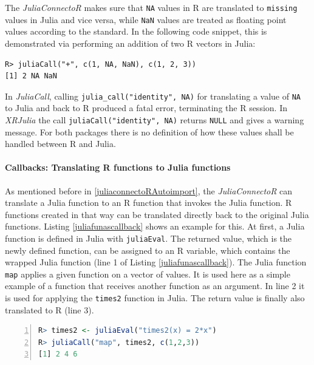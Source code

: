 \documentclass[12pt]{article}
\newcommand{\inlinecode}[1]{\texttt{#1}}
\newcommand{\apkg}[1]{\emph{#1}}
\begin{document}
The \apkg{JuliaConnectoR} makes sure that \inlinecode{NA} values in R are translated to \inlinecode{missing} values in Julia and vice versa, while \inlinecode{NaN} values are treated as floating point values according to the standard.
In the following code snippet, this is demonstrated via performing an addition of two R vectors in Julia:

\begin{lstlisting}
R> juliaCall("+", c(1, NA, NaN), c(1, 2, 3))
[1] 2 NA NaN
\end{lstlisting}


In \apkg{JuliaCall}, calling \inlinecode{julia\_call("identity", NA)} for translating a value of \inlinecode{NA} to Julia and back to R produced a fatal error, terminating the R session.
In \apkg{XRJulia} the call \inlinecode{juliaCall("identity", NA)} returns \inlinecode{NULL} and gives a warning message.
For both packages there is no definition of how these values shall be handled between R and Julia.


\paragraph{Callbacks: Translating R functions to Julia functions}\label{juliaconnectorcallbacks}

As mentioned before in \ref{juliaconnectoRAutoimport}, the \apkg{JuliaConnectoR} can translate a Julia function to an R function that invokes the Julia function.
R functions created in that way can be translated directly back to the original Julia functions.
Listing \ref{juliafunascallback} shows an example for this.
At first, a Julia function is defined in Julia with \inlinecode{juliaEval}.
The returned value, which is the newly defined function, can be assigned to an R variable, which contains the wrapped Julia function (line 1 of Listing \ref{juliafunascallback}).
The Julia function \inlinecode{map} applies a given function on a vector of values.
It is used here as a simple example of a function that receives another function as an argument.
In line 2 it is used for applying the \inlinecode{times2} function in Julia.
The return value is finally also translated to R (line 3). 

\begin{lstlisting}[language=R, float =!h, caption={Passing a reference to a Julia function back to Julia},label={juliafunascallback}, numbers=left]
R> times2 <- juliaEval("times2(x) = 2*x")
R> juliaCall("map", times2, c(1,2,3))
[1] 2 4 6
\end{lstlisting}
\end{document}
